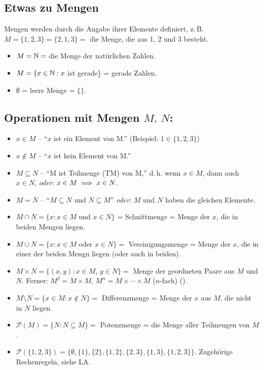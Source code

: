 \documentclass[12pt]{scrreprt}
\begin{document}
\subsection*{Etwas zu Mengen}
Mengen werden durch die Angabe ihrer Elemente definiert, z.\,B. $M = \{1, 2, 3\} = \{2, 1, 3\} =$ die Menge, die aus 1, 2 und 3 besteht.
\begin{itemize}
\item $M = \mathbb{N} =$ die Menge der natürlichen Zahlen.
\item $M = \{x\in\mathbb{N}: x$ ist gerade\} = gerade Zahlen.
\item $\emptyset$ = leere Menge = $\{\}$.
\end{itemize}

\subsection*{Operationen mit Mengen $M,\ N$:}
\begin{itemize}
\item $x \in M$ -- "`$x$ ist ein Element von M."' (Beispiel: $1 \in \{1, 2, 3\}$)
\item $x \notin M$ -- "`$x$ ist kein Element von M."'
\item $M \subseteq N$ -- "`M ist Teilmenge (TM) von M,"' d.\,h. wenn $x \in M$, dann auch $x \in N$, \emph{oder}: $x \in M \implies x \in N$.
\item $M = N$ -- "`$M \subseteq N$ und $N \subseteq M$"' \emph{oder}: $M$ und $N$ haben die gleichen Elemente.
\item $M \cap N = \{x: x \in M$ und $x \in N\}$ = Schnittmenge = Menge der $x$, die in beiden Mengen liegen.
\item $M \cup N = \{x: x \in M$ oder $x \in N\} =$ Vereinigungsmenge = Menge der $x$, die in einer der beiden Mengn liegen (oder auch in beiden).
\item $M \times N = \{(x,y): x \in M$, $y \in N\} =$ Menge der geordneten Paare aus $M$ und $N$. Ferner: $M^2 = M \times M$, $M^n = M \times \dotsb \times M$ ($n$-fach) ().
\item $M \setminus N = \{x \in M: x \notin N\} =$ Differenzmenge = Menge der $x$ aus $M$, die nicht in $N$ liegen.
\item $\mathcal{P}(M) = \{N: N \subseteq M\} =$ Potenzmenge = die Menge aller Teilmengen von $M$.
\item $\mathcal{P}(\{1, 2, 3\}) = \{\emptyset, \{1\}, \{2\}, \{1, 2\}, \{2, 3\}, \{1, 3\}, \{1, 2, 3\}\}$. Zugehörige Rechenregeln, siehe LA.
\end{itemize}
\end{document}
